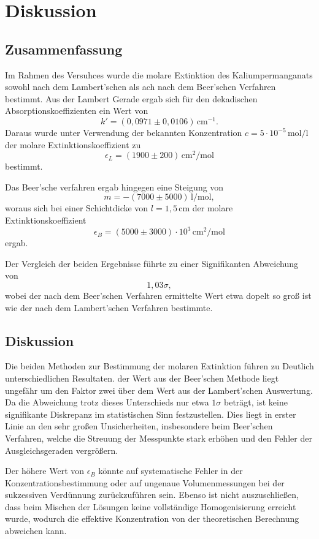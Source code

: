 \chapter{Diskussion}

\section{Zusammenfassung}  
Im Rahmen des Versuhces wurde die molare Extinktion des Kaliumpermanganats sowohl nach dem Lambert'schen als ach nach dem Beer'schen Verfahren bestimmt.  
Aus der Lambert Gerade ergab sich für den dekadischen Absorptionskoeffizienten ein Wert von  
\[
k' = (0{,}0971 \pm 0{,}0106)\,\mathrm{cm^{-1}}.
\]  
Daraus wurde unter Verwendung der bekannten Konzentration \( c = 5 \cdot 10^{-5}\,\mathrm{mol/l} \) der molare Extinktionskoeffizient zu  
\[
\epsilon_L = (1900 \pm 200)\,\mathrm{cm^2/mol}
\]  
bestimmt.  

Das Beer'sche verfahren ergab hingegen eine Steigung von  
\[
m = -(7000 \pm 5000)\,\mathrm{l/mol},
\]  
woraus sich bei einer Schichtdicke von \( l = 1{,}5\,\mathrm{cm} \) der molare Extinktionskoeffizient  
\[
\epsilon_B = (5000 \pm 3000) \cdot 10^3\,\mathrm{cm^2/mol}
\]  
ergab.  

Der Vergleich der beiden Ergebnisse führte zu einer Signifikanten Abweichung von  
\[
1{,}03\sigma,
\]  
wobei der nach dem Beer'schen Verfahren ermittelte Wert etwa dopelt so groß ist wie der nach dem Lambert'schen Verfahren bestimmte.  

\section{Diskussion}  
Die beiden Methoden zur Bestimmung der molaren Extinktion führen zu Deutlich unterschiedlichen Resultaten. der Wert aus der Beer'schen Methode liegt ungefähr um den Faktor zwei über dem Wert aus der Lambert'schen Auswertung. Da die Abweichung trotz dieses Unterschieds nur etwa \( 1\sigma \) beträgt, ist keine signifikante Diskrepanz im statistischen Sinn festzustellen. Dies liegt in erster Linie an den sehr großen Unsicherheiten, insbesondere beim Beer'schen Verfahren, welche die Streuung der Messpunkte stark erhöhen und den Fehler der Ausgleichsgeraden vergrößern.  

Der höhere Wert von \( \epsilon_B \) könnte auf systematische Fehler in der Konzentrationsbestimmung oder auf ungenaue Volumenmessungen bei der sukzessiven Verdünnung zurückzuführen sein. Ebenso ist nicht auszuschließen, dass beim Mischen der Lösungen keine vollständige Homogenisierung erreicht wurde, wodurch die effektive Konzentration von der theoretischen Berechnung abweichen kann.  

